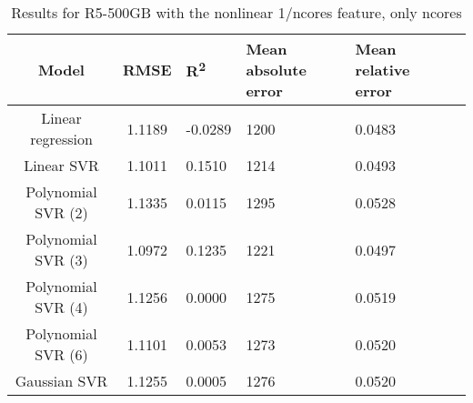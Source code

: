 \begin{table}[H]
\centering
\begin{adjustbox}{center}
\begin{tabular}{c | c M{1.2cm} M{2.5cm} M{2.5cm} M{1.8cm}}
Model & RMSE & R\textsuperscript{2} & Mean absolute error & Mean relative error \tabularnewline
\hline
Linear regression & 1.1189 & -0.0289 &   1200 & 0.0483 \\
Linear SVR & 1.1011 & 0.1510 &   1214 & 0.0493 \\
Polynomial SVR (2) & 1.1335 & 0.0115 &   1295 & 0.0528 \\
Polynomial SVR (3) & 1.0972 & 0.1235 &   1221 & 0.0497 \\
Polynomial SVR (4) & 1.1256 & 0.0000 &   1275 & 0.0519 \\
Polynomial SVR (6) & 1.1101 & 0.0053 &   1273 & 0.0520 \\
Gaussian SVR & 1.1255 & 0.0005 &   1276 & 0.0520 \\
\end{tabular}
\end{adjustbox}
\\
\caption{Results for R5-500GB with the nonlinear 1/ncores feature, only ncores}
\label{tab:all_nonlinear_R5_500}
\end{table}
